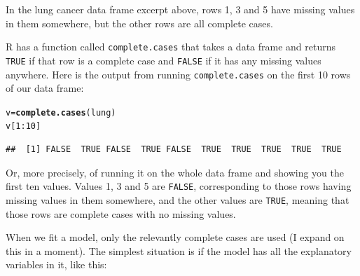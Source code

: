 \documentclass{article}\usepackage[]{graphicx}\usepackage[]{color}
\makeatletter
\newcommand{\hlnum}[1]{\textcolor[rgb]{0.686,0.059,0.569}{#1}}%
\newcommand{\hlopt}[1]{\textcolor[rgb]{0,0,0}{#1}}%
\newcommand{\hlstd}[1]{\textcolor[rgb]{0.345,0.345,0.345}{#1}}%
\newcommand{\hlkwb}[1]{\textcolor[rgb]{0.69,0.353,0.396}{#1}}%
\newcommand{\hlkwd}[1]{\textcolor[rgb]{0.737,0.353,0.396}{\textbf{#1}}}%
\newenvironment{kframe}{%
 \def\at@end@of@kframe{}%
 \ifinner\ifhmode%
  \def\at@end@of@kframe{\end{minipage}}%
  \begin{minipage}{\columnwidth}%
 \fi\fi%
 \def\FrameCommand##1{\hskip\@totalleftmargin \hskip-\fboxsep
 \colorbox{shadecolor}{##1}\hskip-\fboxsep
     \hskip-\linewidth \hskip-\@totalleftmargin \hskip\columnwidth}%
 \MakeFramed {\advance\hsize-\width
   \@totalleftmargin\z@ \linewidth\hsize
   \@setminipage}}%
 {\par\unskip\endMakeFramed%
 \at@end@of@kframe}
\newenvironment{knitrout}{}{} %
\makeatother
\begin{document}
In the lung cancer data frame excerpt above, rows 1, 3 and 5 have
missing values in them somewhere, but the other rows are all complete cases.

R has a function called \texttt{complete.cases} that takes a data
frame and returns \texttt{TRUE} if that row is a complete case and
\texttt{FALSE} if it has any missing values anywhere. Here is the
output from running \texttt{complete.cases} on the first 10 rows of
our data frame:

\begin{knitrout}
\color{fgcolor}\begin{kframe}
\begin{alltt}
\hlstd{v}\hlkwb{=}\hlkwd{complete.cases}\hlstd{(lung)}
\hlstd{v[}\hlnum{1}\hlopt{:}\hlnum{10}\hlstd{]}
\end{alltt}
\begin{verbatim}
##  [1] FALSE  TRUE FALSE  TRUE FALSE  TRUE  TRUE  TRUE  TRUE  TRUE
\end{verbatim}
\end{kframe}
\end{knitrout}

Or, more precisely, of running it on the whole data frame and showing
you the first ten values. Values 1, 3 and 5 are \texttt{FALSE},
corresponding to those rows having missing values in them somewhere,
and the other values are \texttt{TRUE}, meaning that those rows are
complete cases with no missing values.

When we fit a model, only the relevantly complete cases are used (I
expand on this in a moment). The simplest situation is if the model has all
the explanatory variables in it, like this:
\end{document}
